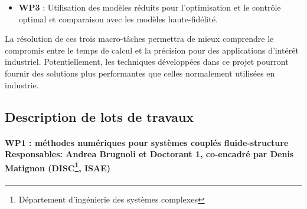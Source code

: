 \documentclass[12pt, french]{article}
\begin{document}
	\begin{itemize}
		\item \textbf{WP3} : Utilisation des modèles réduits pour l'optimisation et le contrôle optimal et comparaison avec les  modèles haute-fidélité. \\
	\end{itemize}
	
La résolution de ces trois macro-tâches permettra de mieux comprendre le compromis entre le temps de calcul et la précision pour des applications d'intérêt industriel. Potentiellement, les techniques développées dans ce projet pourront fournir des solutions plus performantes que celles normalement utilisées en industrie. 

\newpage
\subsection{Description de lots de travaux}
	
	
	\paragraph[\large WP1 : méthodes numériques pour systèmes couplés fluide-structure\\
	Responsables: Andrea Brugnoli et Doctorant 1, co-encadré par Denis Matignon (DISC, ISAE)]{\large WP1 : méthodes numériques pour systèmes couplés fluide-structure\\
		Responsables: Andrea Brugnoli et Doctorant 1, co-encadré par Denis Matignon (DISC\footnote{Département d’ingénierie des systèmes complexes}, ISAE)\\}
	
\end{document}
